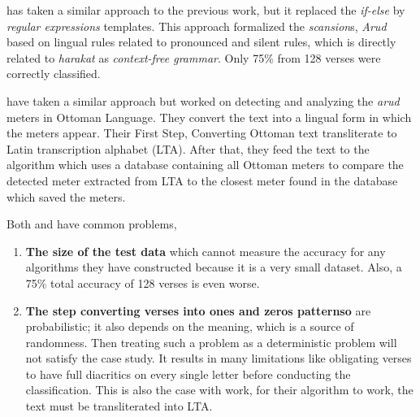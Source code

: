 \cite{Alnagdawi2013FindingArabicPoemMeter} has taken a similar approach to the previous work, but it replaced the \textit{if-else} by \textit{regular expressions} templates. This approach formalized the \textit{scansion}s, \textit{Arud} based on lingual rules related to pronounced and silent rules, which is directly related to \textit{harakat} as \textit{context-free grammar}. Only 75\% from 128 verses were correctly classified. 

\cite{Kurt2012AlgorithmForDetectionAnalysis} have taken a similar approach but worked on detecting and analyzing the \textit{arud} meters in Ottoman Language. They convert the text into a lingual form in which the meters appear. Their First Step, Converting Ottoman text transliterate to Latin transcription alphabet (LTA). After that, they feed the text to the algorithm which uses a database containing all Ottoman meters to compare the detected meter extracted from LTA to the closest meter found in the database which saved the meters.

Both \cite{Abuata2016RuleBasedAlgorithmFor} and \cite{Alnagdawi2013FindingArabicPoemMeter} have common problems,

\begin{enumerate}
\item \textbf{The size of the test data} which cannot measure the accuracy for any algorithms they have constructed because it is a very small dataset. Also, a 75\% total accuracy of 128 verses is even worse.
  \item \textbf{The step converting verses into ones and zeros patternso} are probabilistic; it also depends on the meaning, which is a source of randomness. Then treating such a problem as a deterministic problem will not satisfy the case study. It results in many limitations like obligating verses to have full diacritics on every single letter before conducting the classification. This is also the case with \cite{Kurt2012AlgorithmForDetectionAnalysis} work, for their algorithm to work, the text must be transliterated into LTA.
  \end{enumerate}



